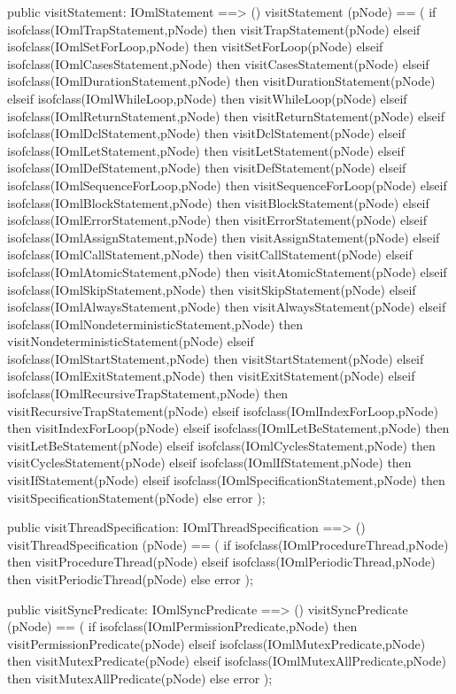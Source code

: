 \begin{vdm_al}
  public visitStatement: IOmlStatement ==> ()
  visitStatement (pNode) ==
    ( if isofclass(IOmlTrapStatement,pNode) then visitTrapStatement(pNode)
      elseif isofclass(IOmlSetForLoop,pNode) then visitSetForLoop(pNode)
      elseif isofclass(IOmlCasesStatement,pNode) then visitCasesStatement(pNode)
      elseif isofclass(IOmlDurationStatement,pNode) then visitDurationStatement(pNode)
      elseif isofclass(IOmlWhileLoop,pNode) then visitWhileLoop(pNode)
      elseif isofclass(IOmlReturnStatement,pNode) then visitReturnStatement(pNode)
      elseif isofclass(IOmlDclStatement,pNode) then visitDclStatement(pNode)
      elseif isofclass(IOmlLetStatement,pNode) then visitLetStatement(pNode)
      elseif isofclass(IOmlDefStatement,pNode) then visitDefStatement(pNode)
      elseif isofclass(IOmlSequenceForLoop,pNode) then visitSequenceForLoop(pNode)
      elseif isofclass(IOmlBlockStatement,pNode) then visitBlockStatement(pNode)
      elseif isofclass(IOmlErrorStatement,pNode) then visitErrorStatement(pNode)
      elseif isofclass(IOmlAssignStatement,pNode) then visitAssignStatement(pNode)
      elseif isofclass(IOmlCallStatement,pNode) then visitCallStatement(pNode)
      elseif isofclass(IOmlAtomicStatement,pNode) then visitAtomicStatement(pNode)
      elseif isofclass(IOmlSkipStatement,pNode) then visitSkipStatement(pNode)
      elseif isofclass(IOmlAlwaysStatement,pNode) then visitAlwaysStatement(pNode)
      elseif isofclass(IOmlNondeterministicStatement,pNode) then visitNondeterministicStatement(pNode)
      elseif isofclass(IOmlStartStatement,pNode) then visitStartStatement(pNode)
      elseif isofclass(IOmlExitStatement,pNode) then visitExitStatement(pNode)
      elseif isofclass(IOmlRecursiveTrapStatement,pNode) then visitRecursiveTrapStatement(pNode)
      elseif isofclass(IOmlIndexForLoop,pNode) then visitIndexForLoop(pNode)
      elseif isofclass(IOmlLetBeStatement,pNode) then visitLetBeStatement(pNode)
      elseif isofclass(IOmlCyclesStatement,pNode) then visitCyclesStatement(pNode)
      elseif isofclass(IOmlIfStatement,pNode) then visitIfStatement(pNode)
      elseif isofclass(IOmlSpecificationStatement,pNode) then visitSpecificationStatement(pNode)
      else error );

  public visitThreadSpecification: IOmlThreadSpecification ==> ()
  visitThreadSpecification (pNode) ==
    ( if isofclass(IOmlProcedureThread,pNode) then visitProcedureThread(pNode)
      elseif isofclass(IOmlPeriodicThread,pNode) then visitPeriodicThread(pNode)
      else error );

  public visitSyncPredicate: IOmlSyncPredicate ==> ()
  visitSyncPredicate (pNode) ==
    ( if isofclass(IOmlPermissionPredicate,pNode) then visitPermissionPredicate(pNode)
      elseif isofclass(IOmlMutexPredicate,pNode) then visitMutexPredicate(pNode)
      elseif isofclass(IOmlMutexAllPredicate,pNode) then visitMutexAllPredicate(pNode)
      else error );


\end{vdm_al}
